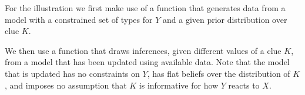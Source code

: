 \documentclass[
  12pt,
]{book}
\newenvironment{Shaded}{\begin{snugshade}}{\end{snugshade}}
\newcommand{\ControlFlowTok}[1]{\textcolor[rgb]{0.13,0.29,0.53}{\textbf{#1}}}
\newcommand{\DataTypeTok}[1]{\textcolor[rgb]{0.13,0.29,0.53}{#1}}
\newcommand{\DecValTok}[1]{\textcolor[rgb]{0.00,0.00,0.81}{#1}}
\newcommand{\KeywordTok}[1]{\textcolor[rgb]{0.13,0.29,0.53}{\textbf{#1}}}
\newcommand{\NormalTok}[1]{#1}
\newcommand{\OperatorTok}[1]{\textcolor[rgb]{0.81,0.36,0.00}{\textbf{#1}}}
\newcommand{\OtherTok}[1]{\textcolor[rgb]{0.56,0.35,0.01}{#1}}
\newcommand{\StringTok}[1]{\textcolor[rgb]{0.31,0.60,0.02}{#1}}
\begin{document}
For the illustration we first make use of a function that generates data from a model with a constrained set of types for \(Y\) and a given prior distribution over clue \(K\).

\begin{Shaded}
\end{Shaded}

We then use a function that draws inferences, given different values of a clue \(K\), from a model that has been updated using available data. Note that the model that is updated has no constraints on \(Y\), has flat beliefs over the distribution of \(K\), and imposes no assumption that \(K\) is informative for how \(Y\) reacts to \(X\).

\begin{Shaded}
\end{Shaded}
\end{document}

